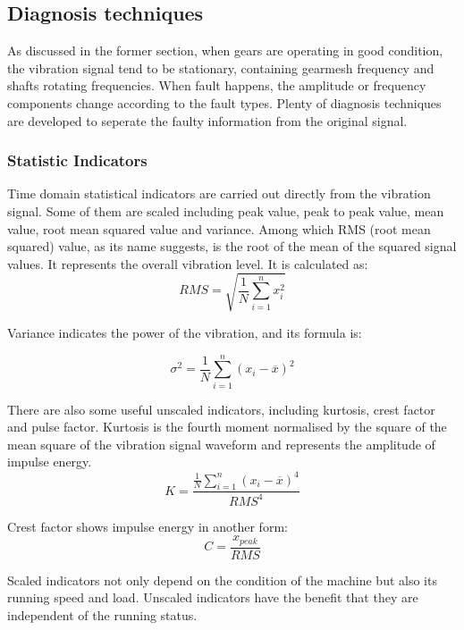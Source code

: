 \subsection{Diagnosis techniques}

As discussed in the former section, when gears are operating in good condition, the vibration signal tend to be stationary, containing gearmesh frequency and shafts rotating frequencies. When fault happens, the amplitude or frequency components change according to the fault types.
Plenty of diagnosis techniques are developed to seperate the faulty information from the original signal. \cite{practical}

\subsubsection{Statistic Indicators}

Time domain statistical indicators are carried out directly from the vibration signal. Some of them are scaled including peak value, peak to peak value, mean value, root mean squared value and variance.
Among which RMS (root mean squared) value, as its name suggests, is the root of the mean of the squared signal values. It represents the overall vibration level. It is calculated as:
\begin{equation}
	RMS = \sqrt{\frac{1}{N}\sum_{i=1}^n x_{i}^2}
\end{equation}

Variance indicates the power of the vibration, and its formula is:

\begin{equation}
	\sigma^2 = \frac{1}{N}\sum_{i=1}^n (x_{i} - \overline{x})^2
\end{equation}

There are also some useful unscaled indicators, including kurtosis, crest factor and pulse factor. Kurtosis is the fourth moment normalised by the square of the mean square of the vibration signal waveform and represents the amplitude of impulse energy. \cite{trending} 
\begin{equation}
	K = \frac{\frac{1}{N}\sum_{i=1}^n (x_{i} - \overline{x})^4}{RMS^4}
\end{equation}

Crest factor shows impulse energy in another form:
\begin{equation}
	C = \frac{x_{peak}}{RMS}
\end{equation}

Scaled indicators not only depend on the condition of the machine but also its running speed and load. Unscaled indicators have the benefit that they are independent of the running status.


